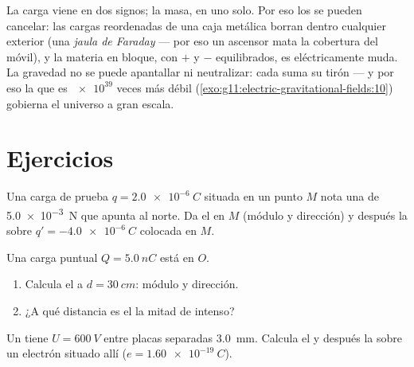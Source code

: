 \begin{remark}\label{rem:g11:electric-gravitational-fields:noanalogue}
La carga viene en dos signos; la masa, en uno solo. Por eso los  se pueden cancelar: las cargas reordenadas de una caja
metálica borran dentro cualquier  exterior (una \emph{jaula de
Faraday} --- por eso un ascensor mata la cobertura del móvil), y la
materia en bloque, con $+$ y $-$ equilibrados, es eléctricamente muda.
La gravedad no se puede apantallar ni neutralizar: cada  suma
su tirón --- y por eso la  que es $\num{e39}$ veces más débil
(\cref{exo:g11:electric-gravitational-fields:10}) gobierna el universo a
gran escala.
\end{remark}

\section{Ejercicios}

\begin{exercise}[$\star$]\label{exo:g11:electric-gravitational-fields:1}
Una carga de prueba $q = \qty{+2.0e-6}{C}$ situada en un punto $M$ nota
una  de \qty{5.0e-3}{N} que apunta al norte. Da el  en $M$
(módulo y dirección) y después la  sobre
$q' = \qty{-4.0e-6}{C}$ colocada en $M$.
\end{exercise}

\begin{exercise}[$\star$]\label{exo:g11:electric-gravitational-fields:2}
Una carga puntual $Q = \qty{+5.0}{nC}$ está en $O$.
\begin{enumerate}
  \item Calcula el  a $d = \qty{30}{cm}$: módulo y dirección.
  \item ¿A qué distancia es el  la mitad de intenso?
\end{enumerate}
\end{exercise}

\begin{exercise}[$\star$]\label{exo:g11:electric-gravitational-fields:3}
Un  tiene $U = \qty{600}{V}$ entre placas separadas
\qty{3.0}{mm}. Calcula el  y después la  sobre un electrón
situado allí ($e = \qty{1.60e-19}{C}$).
\end{exercise}

